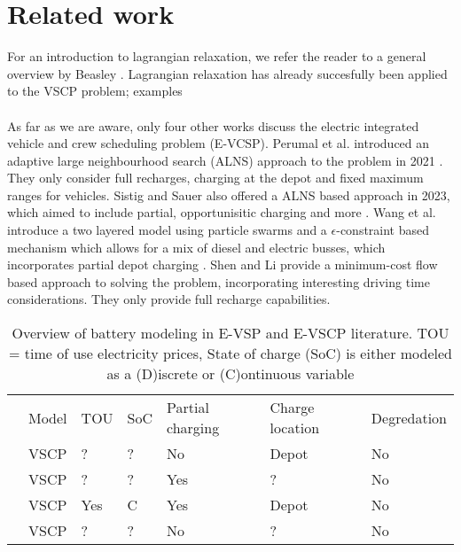 \documentclass[]{article}
\begin{document}
\section{Related work}
For an introduction to lagrangian relaxation, we refer the reader to a general overview by Beasley \cite{Beasley1993}. Lagrangian relaxation has already succesfully been applied to the VSCP problem; examples  \\\\
As far as we are aware, only four other works discuss the electric integrated vehicle and crew scheduling problem (E-VCSP). Perumal et al. introduced an adaptive large neighbourhood search (ALNS) approach to the problem in 2021 \cite{PERUMAL2021105268}. They only consider full recharges, charging at the depot and fixed maximum ranges for vehicles. Sistig and Sauer also offered a ALNS based approach in 2023, which aimed to include partial, opportunisitic charging and more \cite{SISTIG2023120915}. Wang et al. introduce a two layered model using particle swarms and a $\epsilon$-constraint based mechanism which allows for a mix of diesel and electric busses, which incorporates partial depot charging \cite{su14063627}.
Shen and Li provide a minimum-cost flow based approach to solving the problem, incorporating interesting driving time considerations. They only provide full recharge capabilities. \cite{SHEN2023}

\begin{table}[h]
  \centering
  \begin{tabular}{cllllll}
      \toprule
      & Model & TOU & SoC & Partial charging & Charge location & Degredation \\
      \cmidrule(lr){2-7}
      \cite{PERUMAL2021105268} & VSCP & ? & ? & No & Depot & No  \\
      \cite{SISTIG2023120915} & VSCP & ? & ? & Yes & ? & No \\
      \cite{su14063627} & VSCP & Yes & C & Yes & Depot & No \\
      \cite{SHEN2023} & VSCP & ? & ? & No & ? & No \\
      \bottomrule
  \end{tabular}
  \caption{Overview of battery modeling in E-VSP and E-VSCP literature. TOU = time of use electricity prices, State of charge (SoC) is either modeled as a (D)iscrete or (C)ontinuous variable}
  \label{tab:evscp-lit}
\end{table}

\printbibliography
\end{document}
